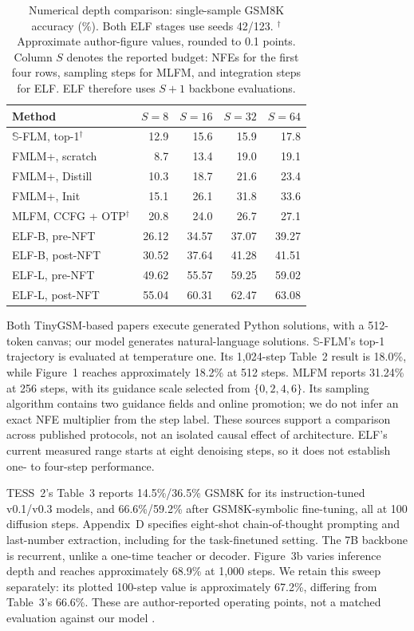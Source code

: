 \begin{table}[ht]
\caption{Numerical depth comparison: single-sample GSM8K accuracy (\%). Both ELF stages use seeds 42/123. $^\dagger$Approximate author-figure values, rounded to 0.1 points. Column $S$ denotes the reported budget: NFEs for the first four rows, sampling steps for MLFM, and integration steps for ELF. ELF therefore uses $S+1$ backbone evaluations.}
\label{tab:continuousnfe}
\centering\small
\begin{tabular}{lrrrr}
\toprule
Method & $S=8$ & $S=16$ & $S=32$ & $S=64$\\
\midrule
$\mathbb S$-FLM, top-1$^\dagger$ & 12.9 & 15.6 & 15.9 & 17.8\\
FMLM+, scratch & 8.7 & 13.4 & 19.0 & 19.1\\
FMLM+, Distill & 10.3 & 18.7 & 21.6 & 23.4\\
FMLM+, Init & 15.1 & 26.1 & 31.8 & 33.6\\
MLFM, CCFG + OTP$^\dagger$ & 20.8 & 24.0 & 26.7 & 27.1\\
\midrule
ELF-B, pre-NFT & 26.12 & 34.57 & 37.07 & 39.27\\
ELF-B, post-NFT & 30.52 & 37.64 & 41.28 & 41.51\\
ELF-L, pre-NFT & 49.62 & 55.57 & 59.25 & 59.02\\
ELF-L, post-NFT & 55.04 & 60.31 & 62.47 & 63.08\\
\bottomrule
\end{tabular}
\end{table}

Both TinyGSM-based papers execute generated Python solutions, with a 512-token canvas; our model generates natural-language solutions. $\mathbb S$-FLM's top-1 trajectory is evaluated at temperature one. Its 1,024-step Table~2 result is 18.0\%, while Figure~1 reaches approximately 18.2\% at 512 steps. MLFM reports 31.24\% at 256 steps, with its guidance scale selected from $\{0,2,4,6\}$. Its sampling algorithm contains two guidance fields and online promotion; we do not infer an exact NFE multiplier from the step label. These sources support a comparison across published protocols, not an isolated causal effect of architecture. ELF's current measured range starts at eight denoising steps, so it does not establish one- to four-step performance.

TESS~2's Table~3 reports 14.5\%/36.5\% GSM8K for its instruction-tuned v0.1/v0.3 models, and 66.6\%/59.2\% after GSM8K-symbolic fine-tuning, all at 100 diffusion steps. Appendix~D specifies eight-shot chain-of-thought prompting and last-number extraction, including for the task-finetuned setting. The 7B backbone is recurrent, unlike a one-time teacher or decoder. Figure~3b varies inference depth and reaches approximately 68.9\% at 1,000 steps. We retain this sweep separately: its plotted 100-step value is approximately 67.2\%, differing from Table~3's 66.6\%. These are author-reported operating points, not a matched evaluation against our model \citep{tess2}.


